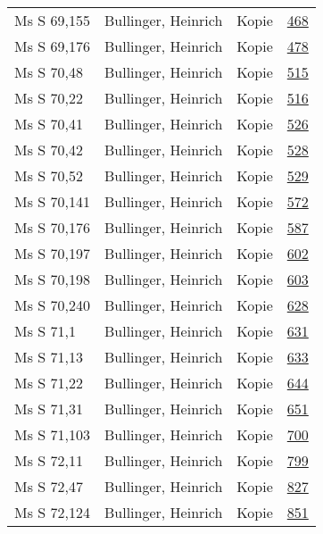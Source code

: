 \documentclass[10pt,a4paper,landscape]{report}
\begin{document}
\begin{longtable}{p{16cm}p{4cm}lr}
Ms S 69,155	&	Bullinger, Heinrich	&	Kopie	&	\href{http://130.60.24.72/assignment/468}{468}\\
Ms S 69,176	&	Bullinger, Heinrich	&	Kopie	&	\href{http://130.60.24.72/assignment/478}{478}\\
Ms S 70,48	&	Bullinger, Heinrich	&	Kopie	&	\href{http://130.60.24.72/assignment/515}{515}\\
Ms S 70,22	&	Bullinger, Heinrich	&	Kopie	&	\href{http://130.60.24.72/assignment/516}{516}\\
Ms S 70,41	&	Bullinger, Heinrich	&	Kopie	&	\href{http://130.60.24.72/assignment/526}{526}\\
Ms S 70,42	&	Bullinger, Heinrich	&	Kopie	&	\href{http://130.60.24.72/assignment/528}{528}\\
Ms S 70,52	&	Bullinger, Heinrich	&	Kopie	&	\href{http://130.60.24.72/assignment/529}{529}\\
Ms S 70,141	&	Bullinger, Heinrich	&	Kopie	&	\href{http://130.60.24.72/assignment/572}{572}\\
Ms S 70,176	&	Bullinger, Heinrich	&	Kopie	&	\href{http://130.60.24.72/assignment/587}{587}\\
Ms S 70,197	&	Bullinger, Heinrich	&	Kopie	&	\href{http://130.60.24.72/assignment/602}{602}\\
Ms S 70,198	&	Bullinger, Heinrich	&	Kopie	&	\href{http://130.60.24.72/assignment/603}{603}\\
Ms S 70,240	&	Bullinger, Heinrich	&	Kopie	&	\href{http://130.60.24.72/assignment/628}{628}\\
Ms S 71,1	&	Bullinger, Heinrich	&	Kopie	&	\href{http://130.60.24.72/assignment/631}{631}\\
Ms S 71,13	&	Bullinger, Heinrich	&	Kopie	&	\href{http://130.60.24.72/assignment/633}{633}\\
Ms S 71,22	&	Bullinger, Heinrich	&	Kopie	&	\href{http://130.60.24.72/assignment/644}{644}\\
Ms S 71,31	&	Bullinger, Heinrich	&	Kopie	&	\href{http://130.60.24.72/assignment/651}{651}\\
Ms S 71,103	&	Bullinger, Heinrich	&	Kopie	&	\href{http://130.60.24.72/assignment/700}{700}\\
Ms S 72,11	&	Bullinger, Heinrich	&	Kopie	&	\href{http://130.60.24.72/assignment/799}{799}\\
Ms S 72,47	&	Bullinger, Heinrich	&	Kopie	&	\href{http://130.60.24.72/assignment/827}{827}\\
Ms S 72,124	&	Bullinger, Heinrich	&	Kopie	&	\href{http://130.60.24.72/assignment/851}{851}\\

\end{longtable}
\end{document}
